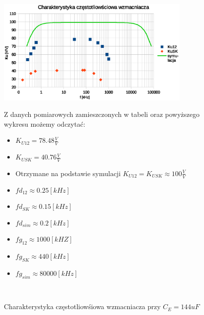 \documentclass[a4paper,12pt]{article}
\begin{document}
\begin{figure}[h!]
  \begin{center}
  \includegraphics[width=0.85\textwidth]{g1.eps}
  \caption{Charakterystyka częstotliowśiowa wzmacniacza przy $C_E = 144uF$}
  \end{center}

  Z danych pomiarowych zamieszczonych w tabeli oraz powyższego wykresu możemy odczytać:
  \begin{itemize}
  \item $K_{U12} = 78.48 \frac{V}{V}$
  \item $K_{USK} = 40.76 \frac{V}{V}$
  \item Otrzymane na podstawie symulacji $K_{U12}=K_{USK}\approx 100\frac{V}{V}$
  \item $fd_{12} \approx 0.25[kHz]$
  \item $fd_{SK} \approx 0.15[kHz]$
  \item $fd_{sim} \approx 0.2[kHz]$
  \item $fg_{12} \approx 1000[kHZ]$
  \item $fg_{SK} \approx 440[kHz]$
  \item $fg_{sim} \approx 80000[kHz]$


  \end{itemize}
    $ $ \newline
$ $ \newline
$ $ \newline
\end{figure}
\end{document}
